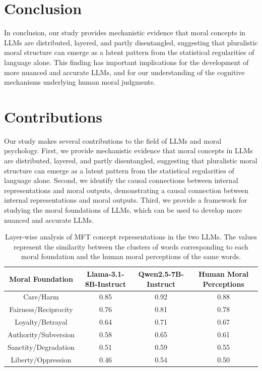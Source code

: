 \documentclass{article}
\begin{document}
\section{Conclusion}
In conclusion, our study provides mechanistic evidence that moral concepts in LLMs are distributed, layered, and partly disentangled, suggesting that pluralistic moral structure can emerge as a latent pattern from the statistical regularities of language alone. This finding has important implications for the development of more nuanced and accurate LLMs, and for our understanding of the cognitive mechanisms underlying human moral judgments.

\section{Contributions}
Our study makes several contributions to the field of LLMs and moral psychology. First, we provide mechanistic evidence that moral concepts in LLMs are distributed, layered, and partly disentangled, suggesting that pluralistic moral structure can emerge as a latent pattern from the statistical regularities of language alone. Second, we identify the causal connections between internal representations and moral outputs, demonstrating a causal connection between internal representations and moral outputs. Third, we provide a framework for studying the moral foundations of LLMs, which can be used to develop more nuanced and accurate LLMs.

\begin{table}[ht]
\centering
\begin{tabular}{|c|c|c|c|}
\hline
Moral Foundation & Llama-3.1-8B-Instruct & Qwen2.5-7B-Instruct & Human Moral Perceptions \\
\hline
Care/Harm & 0.85 & 0.92 & 0.88 \\
\hline
Fairness/Reciprocity & 0.76 & 0.81 & 0.78 \\
\hline
Loyalty/Betrayal & 0.64 & 0.71 & 0.67 \\
\hline
Authority/Subversion & 0.58 & 0.65 & 0.61 \\
\hline
Sanctity/Degradation & 0.51 & 0.59 & 0.55 \\
\hline
Liberty/Oppression & 0.46 & 0.54 & 0.50 \\
\hline
\end{tabular}
\caption{Layer-wise analysis of MFT concept representations in the two LLMs. The values represent the similarity between the clusters of words corresponding to each moral foundation and the human moral perceptions of the same words.}
\end{table}
\end{document}
